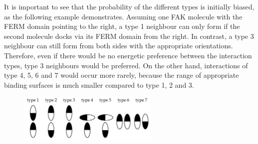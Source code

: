 It is important to see that the probability of the different types is initially biased, as the following example demonstrates. Assuming one FAK molecule with the FERM domain pointing to the right, a type 1 neighbour can only form if the second molecule docks via its FERM domain from the right. In contrast, a type 3 neighbour can still form from both sides with the appropriate orientations. Therefore, even if there would be no energetic preference between the interaction types, type 3 neighbours would be preferred. On the other hand, interactions of type 4, 5, 6 and 7 would occur more rarely, because the range of appropriate binding surfaces is much smaller compared to type 1, 2 and 3.
%
%
%
\begin{figure}
	\centering
	\includegraphics[width=0.6\textwidth]{figures/introduction/classification}
	\label{methods:inttypes}
\end{figure}
%
%
%